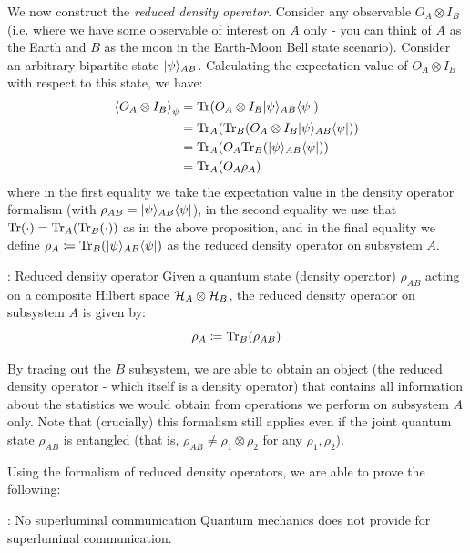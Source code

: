 We now construct the \emph{reduced density operator}. Consider any observable $O_A \otimes I_B$ (i.e. where we have some observable of interest on $A$ only - you can think of $A$ as the Earth and $B$ as the moon in the Earth-Moon Bell state scenario). Consider an arbitrary bipartite state $\lvert \psi \rangle_{AB}$. Calculating the expectation value of $O_A \otimes I_B$ with respect to this state, we have:
\begin{equation}
    \begin{split}
        \left< O_A \otimes I_B \right>_\psi &= \mathrm{Tr}(O_A \otimes I_B \lvert \psi \rangle_{AB}\langle \psi \rvert)
        \\ &= \mathrm{Tr}_A(\mathrm{Tr}_B(O_A \otimes I_B \lvert \psi \rangle_{AB}\langle \psi \rvert))
        \\ &= \mathrm{Tr}_A(O_A \mathrm{Tr}_B(\lvert \psi \rangle_{AB}\langle \psi \rvert))
        \\ &= \mathrm{Tr}_A(O_A\rho_A)
    \end{split}
\end{equation}
where in the first equality we take the expectation value in the density operator formalism (with $\rho_{AB} = \lvert \psi \rangle_{AB}\langle \psi \rvert$), in the second equality we use that $\mathrm{Tr}(\cdot) = \mathrm{Tr}_A(\mathrm{Tr}_B(\cdot))$ as in the above proposition, and in the final equality we define $\rho_A \coloneqq \mathrm{Tr}_B(\lvert \psi \rangle_{AB}\langle \psi \rvert)$ as the reduced density operator on subsystem $A$.

\begin{defbox}{: Reduced density operator}
    Given a quantum state (density operator) $\rho_{AB}$ acting on a composite Hilbert space $\mathcal{H}_A \otimes \mathcal{H}_B$, the reduced density operator on subsystem $A$ is given by:
    \begin{equation}
        \rho_A \coloneqq \mathrm{Tr}_B(\rho_{AB})
    \end{equation}
\end{defbox}

By tracing out the $B$ subsystem, we are able to obtain an object (the reduced density operator - which itself is a density operator) that contains all information about the statistics we would obtain from operations we perform on subsystem $A$ only. Note that (crucially) this formalism still applies even if the joint quantum state $\rho_{AB}$ is entangled (that is, $\rho_{AB} \neq \rho_1 \otimes \rho_2$ for any $\rho_1, \rho_2$). 

Using the formalism of reduced density operators, we are able to prove the following:

\begin{thmbox}{: No superluminal communication}
    Quantum mechanics does not provide for superluminal communication.
\end{thmbox}

